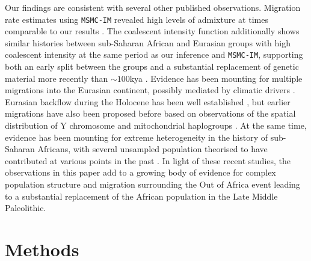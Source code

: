 \documentclass{article}
\begin{document}
Our findings are consistent with several other published observations. Migration rate estimates using {\tt MSMC-IM} revealed high levels of admixture at times comparable to our results \cite{Wang2019a}. The coalescent intensity function additionally shows similar histories between sub-Saharan African and Eurasian groups with high coalescent intensity at the same period as our inference and {\tt MSMC-IM}, supporting both an early split between the groups and a substantial replacement of genetic material more recently than $\sim100$kya \cite{Albers2019}. Evidence has been mounting for multiple migrations into the Eurasian continent, possibly mediated by climatic drivers \cite{Timmermann2016, Pagani2016}. Eurasian backflow during the Holocene has been well established \cite{Lopez2015, GallegoLlorente2015}, but earlier migrations have also been proposed before based on observations of the spatial distribution of Y chromosome and mitochondrial haplogroups \cite{Altheide1997, Hammer1998, Cruciani2002, Chandrasekar2007, Cabrera2018, Hervella2016, Haber2019}. At the same time, evidence has been mounting for extreme heterogeneity in the history of sub-Saharan Africans, with several unsampled population theorised to have contributed at various points in the past \cite{Lipson2019, Durvasula2019, Speidel2019}. In light of these recent studies, the observations in this paper add to a growing body of evidence for complex population structure and migration surrounding the Out of Africa event leading to a substantial replacement of the African population in the Late Middle Paleolithic.  


\section{Methods}
\end{document}
